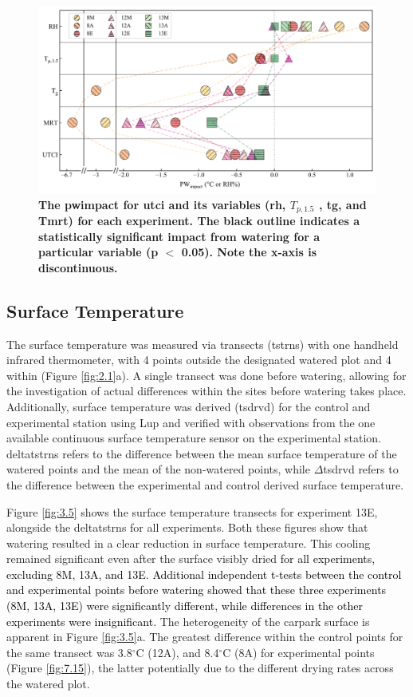 \documentclass[final,3p,times,authoryear]{elsarticle}
\newcommand{\add}[1]{\textcolor{black}{#1}}
\newcommand{\remove}[1]{\textcolor{red}{\st{}}}
\begin{document}
\begin{figure}
\centering
\includegraphics[trim={0 0 0 0},clip,scale=0.7]{utci.png}
\caption{\bf The \gls{pwimpact} for \gls{utci} and its variables (\gls{rh}, $T_{p,1.5}$ , \gls{tg}, and \gls{Tmrt}) for each experiment. The black outline indicates a statistically significant impact from watering for a particular variable (\gls{p} $<$ 0.05). Note the x-axis is discontinuous.}
 \label{fig:3.4}
\end{figure}


\subsection{Surface Temperature}\label{sec:discussion3.3}

The surface temperature was measured via transects (\gls{tstrns}) with one handheld infrared thermometer, with 4 points outside the designated watered plot and 4 within (Figure \ref{fig:2.1}a). A single transect was done before watering, allowing for the investigation of actual differences within the sites before watering takes place. Additionally, surface temperature was derived (\gls{tsdrvd}) for the control and experimental station using \gls{Lup} and verified with observations from the one available continuous surface temperature sensor on the experimental station. \gls{deltatstrns} refers to the difference between the mean surface temperature of the watered points and the mean of the non-watered points, while $\Delta$\gls{tsdrvd} refers to the difference between the experimental and control derived surface temperature.

Figure \ref{fig:3.5} shows the surface temperature transects for experiment 13E, alongside the \gls{deltatstrns} for all experiments. Both these figures show that watering resulted in a clear reduction in surface temperature.\remove{, and} This cooling remained significant even after the surface visibly dried \add{for all experiments, excluding 8M, 13A, and 13E. Additional independent t-tests between the control and experimental points before watering showed that these three experiments (8M, 13A, 13E) were significantly different, while differences in the other experiments were insignificant.} The heterogeneity of the carpark surface is apparent in Figure \ref{fig:3.5}a. The greatest difference within the control points for the same transect was 3.8$^{\circ}$C (12A), and 8.4$^{\circ}$C (8A) for experimental points (Figure \ref{fig:7.15}), the latter potentially due to the different drying rates across the watered plot. 
\end{document}
